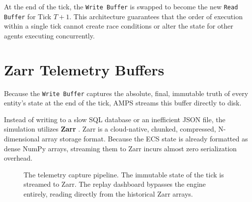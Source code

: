At the end of the tick, the \texttt{Write Buffer} is swapped to become the new \texttt{Read Buffer} for Tick $T+1$. This architecture guarantees that the order of execution within a single tick cannot create race conditions or alter the state for other agents executing concurrently.

\section{Zarr Telemetry Buffers}

Because the \texttt{Write Buffer} captures the absolute, final, immutable truth of every entity's state at the end of the tick, AMPS streams this buffer directly to disk.

Instead of writing to a slow SQL database or an inefficient JSON file, the simulation utilizes \textbf{Zarr} \cite{zarr2023dev}. Zarr is a cloud-native, chunked, compressed, N-dimensional array storage format. Because the ECS state is already formatted as dense NumPy arrays, streaming them to Zarr incurs almost zero serialization overhead.

\begin{figure}[htbp]
\centering
{}
\caption{The telemetry capture pipeline. The immutable state of the tick is streamed to Zarr. The replay dashboard bypasses the engine entirely, reading directly from the historical Zarr arrays.}
\label{fig:zarr_pipeline}
\end{figure}

